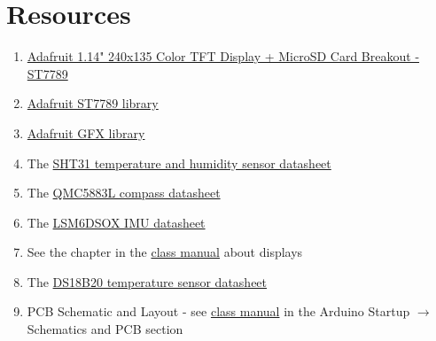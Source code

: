 \section{Resources}\label{sec:datacollectionsresources}
\begin{enumerate}
    \item \href{https://www.adafruit.com/product/4383}{Adafruit 1.14" 240x135 Color TFT Display + MicroSD Card Breakout - ST7789}
    \item \href{https://www.arduino.cc/reference/en/libraries/adafruit-st7735-and-st7789-library/}{Adafruit ST7789 library}
    \item \href{https://learn.adafruit.com/adafruit-gfx-graphics-library}{Adafruit GFX library}
    \item The \href{https://sensirion.com/products/catalog/SHT31-DIS-B/}{SHT31 temperature and humidity sensor datasheet}
    \item The \href{https://www.filipeflop.com/img/files/download/Datasheet-QMC5883L-1.0%20.pdf}{QMC5883L compass datasheet}
    \item The \href{https://www.st.com/resource/en/datasheet/lsm6dsox.pdf}{LSM6DSOX IMU datasheet}    \item See the chapter in the \href{https://github.com/semcneil/Fundamentals-of-Microcontrollers-Manual}{class manual} about displays
    \item The \href{https://cdn-shop.adafruit.com/datasheets/DS18B20.pdf}{DS18B20 temperature sensor datasheet}
    \item PCB Schematic and Layout - see 
            \href{https://github.com/semcneil/Fundamentals-of-Microcontrollers-Manual}{class manual} 
            in the Arduino Startup $\rightarrow$ Schematics and PCB section
\end{enumerate}

